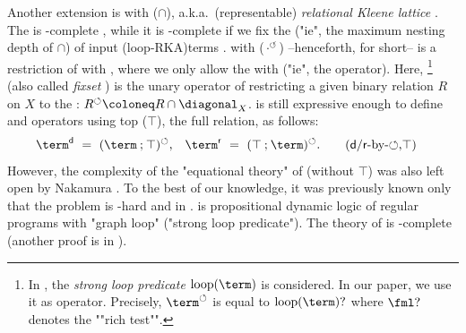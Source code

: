 \documentclass[10pt,a4paper]{article}
\theoremstyle{definition}
\theoremstyle{remark}
\newcommand{\bl}{\cdot}
\newcommand{\defeq}{\coloneq}
\newcommand{\intersection}{\mathbin{\cap}}
\newcommand{\compo}{\mathbin{;}}
\newcommand{\lop}{\circlearrowleft}
\begin{document}
\begin{scope}
Another extension is  with \emph{} ($\intersection$), a.k.a.\ (representable) \emph{relational Kleene lattice} \cite{andrekaEquationalTheoryKleene2011}.
The  is -complete \cite{nakamuraPartialDerivativesGraphs2017,brunetPetriAutomata2017,nakamuraDerivativesGraphsPositive2025},
while it is -complete if we fix the  ("ie", the maximum nesting depth of $\intersection$) of input \kl(loop-RKA){terms} \cite{nakamuraDerivativesGraphsPositive2025}.
 with \emph{} ($\bl^{\lop}$) --henceforth, \emph{} for short-- \cite{nakamuraDerivativesGraphsPositive2025} is a restriction of  with ,
where we only allow the  with  ("ie", the  operator).
Here, \footnote{In \cite{daneckiPropositionalDynamicLogic1984}, the \emph{strong loop predicate} $\mathrm{loop}(\term)$ is considered. In our paper, we use it as operator.
Precisely, $\term^{\lop}$ is equal to $\mathrm{loop}(\term)?$ where $\fml?$ denotes the ""rich test"".}
\cite{daneckiPropositionalDynamicLogic1984,nakamuraUndecidabilityPositiveCalculus2024} (also called \emph{fixset} \cite{hirschAlgebraFunctionsAntidomain2016}) is the unary operator of restricting a given binary relation $R$ on $X$ to the :
$R^{\lop} \defeq R \cap \diagonal_{X}$.
 is still expressive enough to define  and  operators using top ($\top$), the full relation, as follows:
%
\begin{align*}
\term^{\mathsf{d}} ~&=~ (\term \compo \top)^{\lop}, &
\term^{\mathsf{r}} ~&=~ (\top \compo \term)^{\lop}.
\tag{$\mathsf{d}$/$\mathsf{r}$-by-$\lop$,$\top$}\label{equation: dom range by loop top}
\end{align*}
However, the complexity of the "equational theory" of  (without $\top$) was also left open by Nakamura \cite[\S 8]{nakamuraDerivativesGraphsPositive2025}.
To the best of our knowledge, it was previously known only that the problem is -hard \cite{meyerEquivalenceProblemRegular1972} and in  \cite{daneckiPropositionalDynamicLogic1984,gollerPDLIntersectionConverse2009}.
\AP
\intro*{} \cite{daneckiPropositionalDynamicLogic1984} is propositional dynamic logic of regular programs with "graph loop" ("strong loop predicate").
The theory of  is -complete \cite{daneckiPropositionalDynamicLogic1984} (another proof is in \cite[Corollary 4.9]{gollerPDLIntersectionConverse2009}).

\end{scope}
\end{document}
